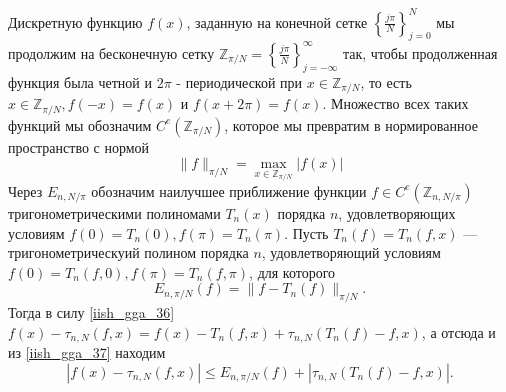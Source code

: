 Дискретную функцию $f(x)$, заданную на конечной сетке $\left\{ \frac{j\pi}{N} \right\}_{j=0}^N$ мы продолжим на бесконечную сетку
$\mathbb{Z}_{\pi/N} = \left\{ \frac{j\pi}{N} \right\}_{j=-\infty}^{\infty}$ так, чтобы продолженная функция была четной и $2\pi$ -
периодической при $x \in \mathbb{Z}_{\pi/N}$, то есть $x \in \mathbb{Z}_{\pi/N}, f(-x) = f(x)$ и $f(x + 2\pi) = f(x)$.
Множество всех таких функций мы обозначим $C^e(\mathbb{Z}_{\pi/N})$, которое мы превратим в нормированное пространство с нормой
\begin{equation*}
  \|f\|_{\pi/N} = \max\limits_{x \in \mathbb{Z}_{\pi/N}} |f(x)|
\end{equation*}
Через $E_{n,N/\pi}$ обозначим наилучшее приближение функции $f \in C^e(\mathbb{Z}_{n, N/\pi})$ тригонометрическими полиномами $T_n(x)$
порядка $n$, удовлетворяющих условиям $f(0) = T_n(0), f(\pi) = T_n(\pi)$. Пусть $T_n(f) = T_n(f,x)$ --- тригонометрическуий
полином порядка $n$, удовлетворяющий условиям $f(0) = T_n(f,0), f(\pi) = T_n(f,\pi)$, для которого
\begin{equation}
  E_{n,\pi/N}(f) = \|f - T_n(f)\|_{\pi/N}. \label{iish_gga_37}
\end{equation}
Тогда в силу \eqref{iish_gga_36} $f(x) - \tau_{n,N}(f,x) = f(x) - T_n(f,x) + \tau_{n,N}(T_n(f) - f, x)$,
а отсюда и из \eqref{iish_gga_37} находим
\begin{equation}
  |f(x) - \tau_{n,N}(f,x)| \leq E_{n,\pi/N}(f) + |\tau_{n,N}(T_{n}(f)-f, x)|. \label{iish_gga_38}
\end{equation}

